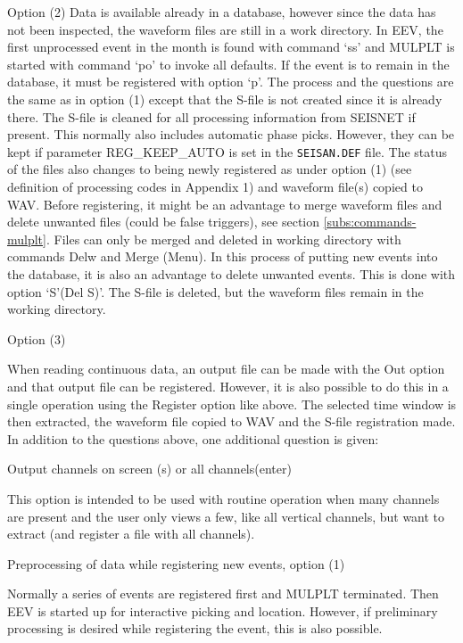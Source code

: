 Option (2) \newline
Data is available already in a database, however since the data has not been inspected, the waveform files are still in a work directory. In EEV, the first unprocessed event in the month is found 
with command `ss' and MULPLT is started with command `po' to invoke all defaults. If the event is to remain in the database, it must be registered with option `p'. The process and the questions are the same as in option (1) except that the S-file is not created since it is already there. The S-file is cleaned for all processing information from SEISNET if present. This normally also includes automatic phase picks. However, they can be kept if parameter REG\_KEEP\_AUTO is set in the \texttt{SEISAN.DEF} file. The status of the files also changes to being newly registered as under option (1) (see definition of processing codes in Appendix 1) and waveform file(s) copied to WAV. Before registering, it might be an advantage to merge waveform files and delete unwanted files (could be false triggers), see section \ref{subs:commands-mulplt}. Files can only be merged and deleted in working directory with commands Delw and Merge (Menu). In this process of putting new events into the database, it is also an advantage to delete unwanted events. This is done with option `S'(Del S)'. The S-file is deleted, but the waveform files remain in the working directory. 

Option (3) \newline

When reading continuous data, an output file can be made with the Out option and that output file can be registered. However, it is also possible to do this in a single operation using the Register option like above. The selected time window is then extracted, the waveform file copied to WAV and the S-file registration made. In addition to the questions above, one additional question is given: 

Output channels on screen (s) or all channels(enter)

This option is intended to be used with routine operation when many channels are present and the user only views a few, like all vertical channels, but want to extract (and register a file with all channels).

Preprocessing of data while registering new events, option (1) 

Normally a series of events are registered first and MULPLT terminated. Then EEV is started up for interactive picking and location. However, if preliminary processing is desired while registering the event, this is also possible. 

